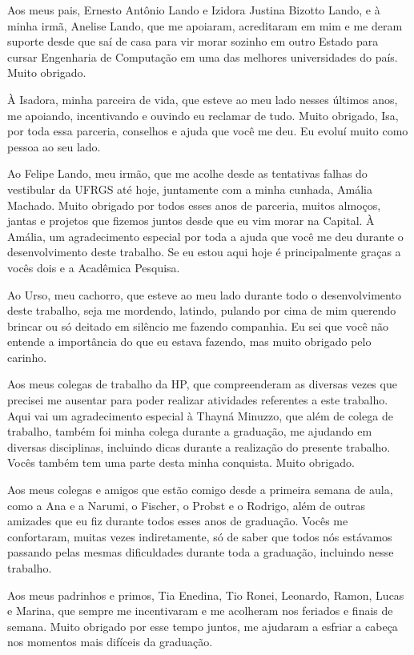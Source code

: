 Aos meus pais, Ernesto Antônio Lando e Izidora Justina Bizotto Lando, e à minha irmã, Anelise Lando, que me apoiaram, acreditaram em mim e me deram suporte desde que saí de casa para vir morar sozinho em outro Estado para cursar Engenharia de Computação em uma das melhores universidades do país. Muito obrigado.

À Isadora, minha parceira de vida, que esteve ao meu lado nesses últimos anos, me apoiando, incentivando e ouvindo eu reclamar de tudo.
Muito obrigado, Isa, por toda essa parceria, conselhos e ajuda que você me deu. Eu evoluí muito como pessoa ao seu lado.

Ao Felipe Lando, meu irmão, que me acolhe desde as tentativas falhas do vestibular da UFRGS até hoje, juntamente com a minha cunhada, Amália Machado.
Muito obrigado por todos esses anos de parceria, muitos almoços, jantas e projetos que fizemos juntos desde que eu vim morar na Capital.
À Amália, um agradecimento especial por toda a ajuda que você me deu durante o desenvolvimento deste trabalho.
Se eu estou aqui hoje é principalmente graças a vocês dois e a Acadêmica Pesquisa.

Ao Urso, meu cachorro, que esteve ao meu lado durante todo o desenvolvimento deste trabalho, seja me mordendo, latindo, pulando por cima de mim querendo brincar ou só deitado em silêncio me fazendo companhia.
Eu sei que você não entende a importância do que eu estava fazendo, mas muito obrigado pelo carinho.

Aos meus colegas de trabalho da HP, que compreenderam as diversas vezes que precisei me ausentar para poder realizar atividades referentes a este trabalho.
Aqui vai um agradecimento especial à Thayná Minuzzo, que além de colega de trabalho, também foi minha colega durante a graduação, me ajudando em diversas disciplinas, incluindo dicas durante a realização do presente trabalho.
Vocês também tem uma parte desta minha conquista. Muito obrigado.

Aos meus colegas e amigos que estão comigo desde a primeira semana de aula, como a Ana e a Narumi, o Fischer, o Probst e o Rodrigo, além de outras amizades que eu fiz durante todos esses anos de graduação.
Vocês me confortaram, muitas vezes indiretamente, só de saber que todos nós estávamos passando pelas mesmas dificuldades durante toda a graduação, incluindo nesse trabalho.

Aos meus padrinhos e primos, Tia Enedina, Tio Ronei, Leonardo, Ramon, Lucas e Marina, que sempre me incentivaram e me acolheram nos feriados e finais de semana.
Muito obrigado por esse tempo juntos, me ajudaram a esfriar a cabeça nos momentos mais difíceis da graduação.

